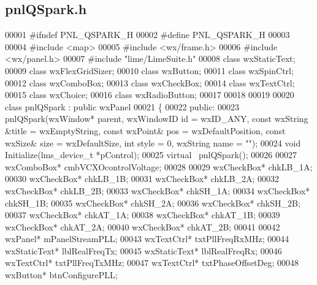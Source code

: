 \subsection{pnl\+Q\+Spark.\+h}
\label{pnlQSpark_8h_source}

\begin{DoxyCode}
00001 \textcolor{preprocessor}{#ifndef PNL\_QSPARK\_H}
00002 \textcolor{preprocessor}{#define PNL\_QSPARK\_H}
00003 
00004 \textcolor{preprocessor}{#include <map>}
00005 \textcolor{preprocessor}{#include <wx/frame.h>}
00006 \textcolor{preprocessor}{#include <wx/panel.h>}
00007 \textcolor{preprocessor}{#include "lime/LimeSuite.h"}
00008 \textcolor{keyword}{class }wxStaticText;
00009 \textcolor{keyword}{class }wxFlexGridSizer;
00010 \textcolor{keyword}{class }wxButton;
00011 \textcolor{keyword}{class }wxSpinCtrl;
00012 \textcolor{keyword}{class }wxComboBox;
00013 \textcolor{keyword}{class }wxCheckBox;
00014 \textcolor{keyword}{class }wxTextCtrl;
00015 \textcolor{keyword}{class }wxChoice;
00016 \textcolor{keyword}{class }wxRadioButton;
00017 
00018 
00019 
00020 \textcolor{keyword}{class }pnlQSpark : \textcolor{keyword}{public} wxPanel
00021 \{
00022 \textcolor{keyword}{public}:
00023     pnlQSpark(wxWindow* parent, wxWindowID \textcolor{keywordtype}{id} = wxID\_ANY, \textcolor{keyword}{const} wxString &title = wxEmptyString, \textcolor{keyword}{const} 
      wxPoint& pos = wxDefaultPosition, \textcolor{keyword}{const} wxSize& size = wxDefaultSize, \textcolor{keywordtype}{int} style = 0, wxString 
      name = \textcolor{stringliteral}{""});
00024     \textcolor{keywordtype}{void} Initialize(lms_device_t *pControl);
00025     \textcolor{keyword}{virtual} ~pnlQSpark();
00026 
00027     wxComboBox* cmbVCXOcontrolVoltage;
00028     
00029     wxCheckBox* chkLB_1A;
00030     wxCheckBox* chkLB_1B;
00031     wxCheckBox* chkLB_2A;
00032     wxCheckBox* chkLB_2B;
00033     wxCheckBox* chkSH_1A;
00034     wxCheckBox* chkSH_1B;
00035     wxCheckBox* chkSH_2A;
00036     wxCheckBox* chkSH_2B;
00037     wxCheckBox* chkAT_1A;
00038     wxCheckBox* chkAT_1B;
00039     wxCheckBox* chkAT_2A;
00040     wxCheckBox* chkAT_2B;
00041 
00042     wxPanel* mPanelStreamPLL;
00043     wxTextCtrl* txtPllFreqRxMHz;
00044     wxStaticText* lblRealFreqTx;
00045     wxStaticText* lblRealFreqRx;
00046     wxTextCtrl* txtPllFreqTxMHz;
00047     wxTextCtrl* txtPhaseOffsetDeg;
00048     wxButton* btnConfigurePLL;

\end{DoxyCode}
